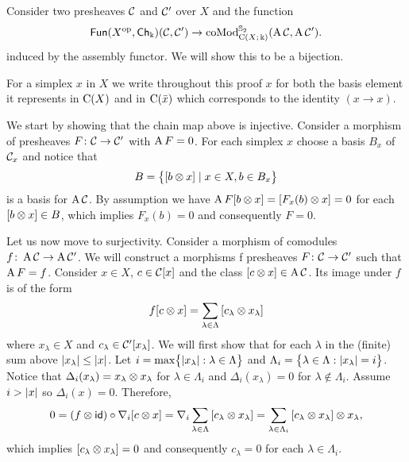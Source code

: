 
Consider two presheaves $\cC$ and $\cC'$ over $X$ and the function
\[
\Fun(X^\op, \Ch_\k)(\cC, \cC') \to \coMod^{\Sym_2}_{\chains(X;\, \k)}(\assembly \cC, \assembly \cC').
\]
induced by the assembly functor.
We will show this to be a bijection.

For a simplex $x$ in $X$ we write throughout this proof $x$ for both the basis element it represents in $\chains(X)$ and in $\chains(\bar x)$ which corresponds to the identity $(x \to x)$.

We start by showing that the chain map above is injective.
Consider a morphism of presheaves $F \colon \cC \to \cC'$ with $\assembly F = 0$.
For each simplex $x$ choose a basis $B_x$ of $\cC_x$ and notice that
\[
B = \set[\big]{[b \ot x] \mid x \in X, b \in B_x}
\]
is a basis for $\assembly \cC$.
By assumption we have $\assembly F [b \ot x] = [F_x(b) \ot x] = 0$ for each $[b \ot x] \in B$, which implies $F_x(b) = 0$ and consequently $F = 0$.

Let us now move to surjectivity.
Consider a morphism of comodules $f \colon \assembly \cC \to \assembly \cC'$.
We will construct a morphisms f presheaves $F \colon \cC \to \cC'$ such that $\assembly F = f$.
Consider $x \in X$, $c \in \cC[x]$ and the class $[c \ot x] \in \assembly \cC$.
Its image under $f$ is of the form
\[
f[c \ot x] = \sum_{\lambda \in \Lambda} \, [c_\lambda \ot x_\lambda]
\]
where $x_\lambda \in X$ and $c_\lambda \in \cC'[x_\lambda]$.
We will first show that for each $\lambda$ in the (finite) sum above $\bars{x_\lambda} \leq \bars{x}$.
Let $i = \max \set[\big]{\bars{x_\lambda} : \lambda \in \Lambda}$ and $\Lambda_i = \set[\big]{\lambda \in \Lambda : \bars{x_\lambda} = i}$.
Notice that $\Delta_i(x_{\lambda}) = x_{\lambda} \ot x_{\lambda}$ for $\lambda \in \Lambda_i$ and $\Delta_i(x_{\lambda}) = 0$ for $\lambda \notin \Lambda_i$.
Assume $i > \bars{x}$ so $\Delta_i(x) = 0$.
Therefore,
\begin{align*}
	0 =
	(f \ot \id) \circ \nabla_i [c \ot x] =
	\nabla_i \sum_{\lambda \in \Lambda} \, [c_\lambda \ot x_\lambda] =
	\sum_{\lambda \in \Lambda_i} \, [c_{\lambda} \ot x_{\lambda}] \ot x_{\lambda},
\end{align*}
which implies $[c_{\lambda} \ot x_{\lambda}] = 0$ and consequently $c_{\lambda} = 0$ for each $\lambda \in \Lambda_i$.

